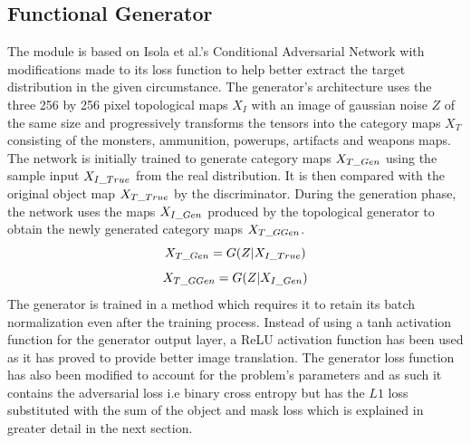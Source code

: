 \documentclass{Configuration_Files/PoliMi3i_thesis}
\begin{document}
\subsection{Functional Generator}
The module is based on Isola et al.’s Conditional Adversarial Network with 
modifications made to its loss function to help better extract the target distribution in 
the given circumstance. The generator’s architecture uses the three 256 by 256 pixel 
topological maps $X_{I}$ with an image of gaussian noise $Z$ of the same size and 
progressively transforms the tensors into the category maps $X_{T}$ consisting of the 
monsters, ammunition, powerups, artifacts and weapons maps. The network is 
initially trained to generate category maps $X_{T\char`_Gen}$ using the sample input $X_{I\char`_True}$ 
from the real distribution. It is then compared with the original object map $X_{T\char`_True}$ by 
the discriminator. During the generation phase, the network uses the maps $X_{I\char`_Gen}$ 
produced by the topological generator to obtain the newly generated category maps 
$X_{T\char`_GGen}$.
\begin{equation} \label{eq:ctgen}
X_{T\char`_Gen} = G(Z|X_{I\char`_True}) 
\end{equation}
\begin{equation} \label{eq:cggen}
X_{T\char`_GGen} = G(Z|X_{I\char`_Gen})
\end{equation}
The generator is trained in a method which requires it to retain its batch 
normalization even after the training process. Instead of using a tanh activation 
function for the generator output layer, a ReLU activation function 
has been used as it has proved to provide better image translation. The generator loss 
function has also been modified to account for the problem's parameters and as such 
it contains the adversarial loss i.e binary cross entropy but has the $L1$ loss substituted 
with the sum of the object and mask loss which is explained in greater detail in the 
next section.
\end{document}
